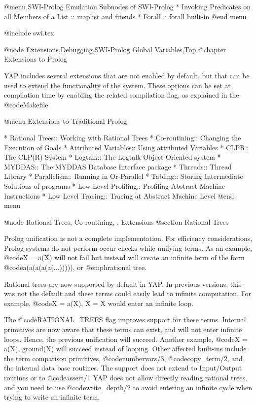 {{{{{{{{{@menu SWI-Prolog Emulation
Subnodes of SWI-Prolog
* Invoking Predicates on all Members of a List :: maplist and friends
* Forall :: forall built-in
@end menu

@include swi.tex

@node Extensions,Debugging,SWI-Prolog Global Variables,Top 
@chapter Extensions to Prolog

YAP includes several extensions that are not enabled by
default, but that can be used to extend the functionality of the
system. These options can be set at compilation time by enabling the
related compilation flag, as explained in the @code{Makefile}

@menu
Extensions to Traditional Prolog

* Rational Trees:: Working with Rational Trees
* Co-routining:: Changing the Execution of Goals
* Attributed Variables:: Using attributed Variables
* CLPR:: The CLP(R) System
* Logtalk:: The Logtalk Object-Oriented system
* MYDDAS:: The MYDDAS Database Interface package
* Threads:: Thread Library
* Parallelism:: Running in Or-Parallel
* Tabling:: Storing Intermediate Solutions of programs 
* Low Level Profiling:: Profiling Abstract Machine Instructions
* Low Level Tracing:: Tracing at Abstract Machine Level
@end menu

@node Rational Trees, Co-routining, , Extensions
@section Rational Trees

Prolog unification is not a complete implementation. For efficiency
considerations, Prolog systems do not perform occur checks while
unifying terms. As an example, @code{X = a(X)} will not fail but instead
will create an infinite term of the form @code{a(a(a(a(a(...)))))}, or
@emph{rational tree}.

Rational trees are now supported by default in YAP. In previous
versions, this was not the default and these terms could easily lead
to infinite computation. For example, @code{X = a(X), X = X} would
enter an infinite loop.

The @code{RATIONAL_TREES} flag improves support for these
terms. Internal primitives are now aware that these terms can exist, and
will not enter infinite loops. Hence, the previous unification will
succeed. Another example, @code{X = a(X), ground(X)} will succeed
instead of looping. Other affected built-ins include the term comparison
primitives, @code{numbervars/3}, @code{copy_term/2}, and the internal
data base routines. The support does not extend to Input/Output routines
or to @code{assert/1} YAP does not allow directly reading
rational trees, and you need to use @code{write_depth/2} to avoid
entering an infinite cycle when trying to write an infinite term.

}}}}}}}}}
